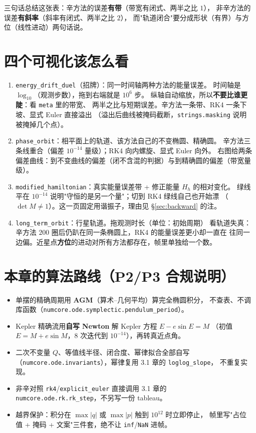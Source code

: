 三句话总结这张表：辛方法的误差\textbf{有带}（带宽有闭式、两半之比 $1$），
非辛方法的误差\textbf{有斜率}（斜率有闭式、两半之比 $2$），
而"轨道闭合"要分成形状（有界）与方位（线性进动）两句话说。

\section{四个可视化该怎么看}

\begin{enumerate}
  \item \texttt{energy\_\allowbreak drift\_\allowbreak duel}（招牌）：同一时间轴两种方法的能量误差。
        时间轴是 $\log_{10}$（观测步数），拖到右端就是 $10^6$ 步。
        纵轴自动缩放，所以\textbf{不要比谁更陡}：看 \texttt{meta} 里的带宽、
        两半之比与短期误差。辛方法一条带、RK4 一条下坡、显式 Euler 直接溢出
        （溢出后曲线被掩码截断，\texttt{strings.masking} 说明被掩掉几个点）。
  \item \texttt{phase\_\allowbreak orbit}：相平面上的轨道、该方法自己的不变椭圆、精确圆。
        辛方法三条线重合（偏差 $10^{-14}$ 量级）；RK4 向内螺旋、显式 Euler 向外。
        右图给两条偏差曲线：到不变曲线的偏差（闭不含混的判据）与到精确圆的偏差（带宽量级）。
  \item \texttt{modified\_\allowbreak hamiltonian}：真实能量误差带 + 修正能量 $H_h$ 的相对变化。
        绿线平在 $10^{-14}$ 说明"守恒的是另一个量"；切到 RK4 绿线自己也开始漂
        （$\det M\ne1$）。这一页固定用谐振子，理由见 \S\ref{sec:backward} 的注。
  \item \texttt{long\_\allowbreak term\_\allowbreak orbit}：行星轨道。拖观测时长（单位：初始周期）
        看轨道失真：辛方法 $200$ 圈后仍趴在同一条椭圆上，RK4 的能量误差更小却一直在
        往同一边偏。近星点\textbf{方位}的进动对所有方法都存在，帧里单独给一个数。
\end{enumerate}

\section{本章的算法路线（P2/P3 合规说明）}

\begin{itemize}
  \item 单摆的精确周期用 \textbf{AGM}（算术--几何平均）算完全椭圆积分，
        不查表、不调库函数（\texttt{numcore.ode.symplectic.pendulum\_period}）。
  \item Kepler 精确流用\textbf{自写 Newton} 解 Kepler 方程 $E-e\sin E=M$
        （初值 $E=M+e\sin M$，$8$ 次迭代到 $10^{-14}$），再转真近点角。
  \item 二次不变量 $Q$、等值线半径、闭合度、幂律拟合全部自写
        （\texttt{numcore.ode.invariants}），幂律复用 3.1 章的 \texttt{loglog\_slope}，
        不重复实现。
  \item 非辛对照 \texttt{rk4}/\texttt{explicit\_\allowbreak euler} 直接调用 3.1 章的
        \texttt{numcore.ode.rk.rk\_step}，不另写一份 tableau。
  \item 越界保护：积分在 $\max|q|$ 或 $\max|p|$ 触到 $10^{12}$ 时立即停止，
        帧里写"占位值 + 掩码 + 文案"三件套，绝不让 \texttt{inf}/\texttt{NaN} 进帧。
\end{itemize}

